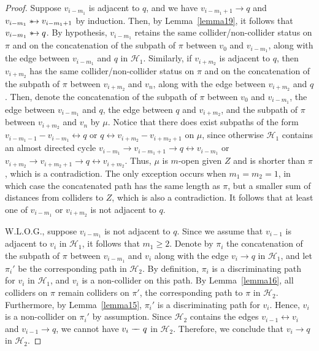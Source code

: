 \documentclass[accepted]{uai2025} %
\newcommand{\huh}{\mathrel{\leftrightarrow}}
\newcommand{\suh}{\mathrel{{\ast\mkern-11mu\to}}}
\newcommand{\tut}{\mathrel{{\relbar\mkern-9mu\relbar}}}
\begin{document}
\begin{proof}
Suppose \( v_{i-m_1} \) is adjacent to \( q \), and we have \( v_{i-m_1+1} \rightarrow q \) and \( v_{i-m_1} \suh v_{i-m_1+1} \) by induction. Then, by Lemma~\ref{lemma19}, it follows that \( v_{i-m_1} \suh q \). By hypothesis, \( v_{i-m_1} \) retains the same collider/non-collider status on \( \pi \) and on the concatenation of the subpath of \( \pi \) between \( v_0 \) and \( v_{i-m_1} \), along with the edge between \( v_{i-m_1} \) and \( q \) in \( \mathcal{H}_1 \). Similarly, if \( v_{i+m_2} \) is adjacent to \( q \), then \( v_{i+m_2} \) has the same collider/non-collider status on \( \pi \) and on the concatenation of the subpath of \( \pi \) between \( v_{i+m_2} \) and \( v_n \), along with the edge between \( v_{i+m_2} \) and \( q \). Then, denote the concatenation of the subpath of \( \pi \) between \( v_0 \) and \( v_{i-m_1} \), the edge between \( v_{i-m_1} \) and \( q \), the edge between \( q \) and \( v_{i+m_2} \), and the subpath of \( \pi \) between \( v_{i+m_2} \) and \( v_n \) by \( \mu \). Notice that there does exist subpaths of the form \( v_{i-m_1-1}-v_{i-m_1}\huh  q \) or \( q\huh  v_{i+m_2}-v_{i+m_2+1} \) on \( \mu \), since otherwise \( \mathcal{H}_1 \) contains an almost directed cycle \( v_{i-m_1}\rightarrow v_{i-m_1+1}\rightarrow q\huh  v_{i-m_1} \) or \( v_{i+m_2}\rightarrow v_{i+m_2+1}\rightarrow q\huh  v_{i+m_2} \). Thus, \( \mu \) is $m$-open given \( Z \) and is shorter than \( \pi \), which is a contradiction. The only exception occurs when \( m_1 = m_2 = 1 \), in which case the concatenated path has the same length as \( \pi \), but a smaller sum of distances from colliders to \( Z \), which is also a contradiction. It follows that at least one of \( v_{i-m_1} \) or \( v_{i+m_2} \) is not adjacent to \( q \).

W.L.O.G., suppose \( v_{i-m_1} \) is not adjacent to \( q \). Since we assume that \( v_{i-1} \) is adjacent to \( v_i \) in \( \mathcal{H}_1 \), it follows that \( m_1 \geq 2 \). Denote by \( \pi_i \) the concatenation of the subpath of \( \pi \) between \( v_{i-m_1} \) and \( v_i \) along with the edge \( v_i \rightarrow q \) in \( \mathcal{H}_1 \), and let \( \pi_i' \) be the corresponding path in \( \mathcal{H}_2 \). By definition, \( \pi_i \) is a discriminating path for \( v_i \) in \( \mathcal{H}_1 \), and \( v_i \) is a non-collider on this path. By Lemma~\ref{lemma16}, all colliders on \( \pi \) remain colliders on \( \pi' \), the corresponding path to \( \pi \) in \( \mathcal{H}_2 \). Furthermore, by Lemma~\ref{lemma15}, \( \pi_i' \) is a discriminating path for \( v_i \). Hence, \( v_i \) is a non-collider on \( \pi_i' \) by assumption. Since \( \mathcal{H}_2 \) contains the edges \( v_{i-1} \huh v_i \) and \( v_{i-1} \rightarrow q \), we cannot have \( v_i \tut q \) in \( \mathcal{H}_2 \). Therefore, we conclude that \( v_i \rightarrow q \) in \( \mathcal{H}_2 \).

\end{proof}
\end{document}

